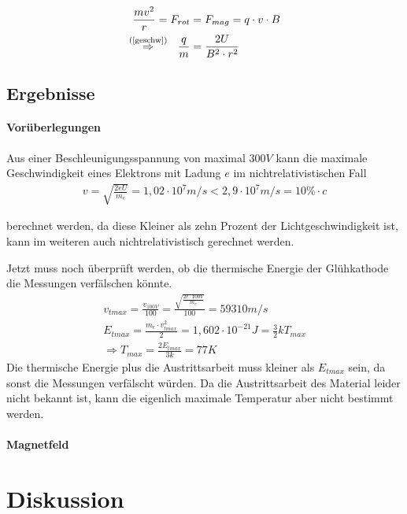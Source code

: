 \documentclass[11pt, a4paper]{article}
\begin{document}
    \begin{align}{}
        \frac{mv^2}{r} = F_{rot} &= F_{mag} = q \cdot v \cdot B \\
        \overset{\text{(\ref{geschw})}}{\Rightarrow} \ \  \frac{q}{m} &= \frac{2U}{B^2 \cdot r^2} \\
    \end{align}

    \subsection{Ergebnisse}
    \paragraph{Vorüberlegungen}

    Aus einer Beschleunigungsspannung von maximal $300 \si{V}$ kann die maximale Geschwindigkeit eines Elektrons mit Ladung $e$ im nichtrelativistischen Fall
    \begin{align}
        v = \sqrt{\frac{2 e U}{m_e}} = 1,02 \cdot 10^{7} \si{m/s} < 2,9 \cdot 10^{7} \si{m/s} = 10\% \cdot c
    \end{align}

    berechnet werden, da diese Kleiner als zehn Prozent der Lichtgeschwindigkeit ist, kann im weiteren auch nichtrelativistisch gerechnet werden.

    Jetzt muss noch überprüft werden, ob die thermische Energie der Glühkathode die Messungen verfälschen könnte.
    \begin{align}
        v_{tmax} = \frac{v_{100V}}{100} = \frac{\sqrt{\frac{2 e \cdot 100 \si{V}}{m_e}}}{100} = 59310 \si{m \per s} \\
        E_{tmax} = \frac{m_e \cdot v_{tmax}^2}{2} = 1,602 \cdot 10^{-21} \si{J} = \frac{3}{2} k T_{max} \\
        \Rightarrow T_{max} = \frac{2 E_{tmax}}{3 k} = 77K
    \end{align}
    Die thermische Energie plus die Austrittsarbeit muss kleiner als $E_{tmax}$ sein, da sonst die Messungen verfälscht würden. Da die Austrittsarbeit des Material leider nicht bekannt ist, kann die eigenlich maximale Temperatur aber nicht bestimmt werden.

    \paragraph{Magnetfeld}

    

    \section{Diskussion}

    
    
\end{document}
